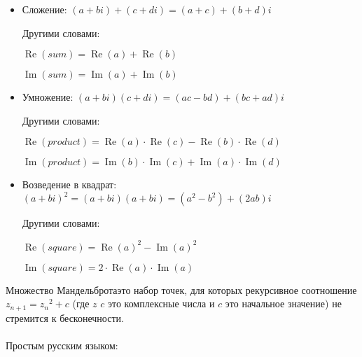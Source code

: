\begin{itemize}
\item Сложение: $(a+bi) + (c+di) = (a+c) + (b+d)i$

Другими словами:

$\operatorname{Re}(sum) = \operatorname{Re}(a) + \operatorname{Re}(b)$

$\operatorname{Im}(sum) = \operatorname{Im}(a) + \operatorname{Im}(b)$

\item Умножение: $(a+bi) (c+di) = (ac-bd) + (bc+ad)i$

Другими словами:

$\operatorname{Re}(product) = \operatorname{Re}(a) \cdot \operatorname{Re}(c) - \operatorname{Re}(b) \cdot \operatorname{Re}(d)$

$\operatorname{Im}(product) = \operatorname{Im}(b) \cdot \operatorname{Im}(c) + \operatorname{Im}(a) \cdot \operatorname{Im}(d)$

\item Возведение в квадрат: $(a+bi)^2 = (a+bi) (a+bi) = (a^2-b^2) + (2ab)i$

Другими словами:

$\operatorname{Re}(square) = \operatorname{Re}(a)^2-\operatorname{Im}(a)^2$

$\operatorname{Im}(square) = 2 \cdot \operatorname{Re}(a) \cdot \operatorname{Im}(a)$

\end{itemize}


Множество Мандельброта\EMDASH{}это набор точек, для которых рекурсивное соотношение
 $z_{n+1} = {z_n}^2 + c$ 
(где $z$ \AndENRU $c$ это комплексные числа и $c$ 
это начальное значение)
не стремится к бесконечности.\\
\\
Простым русским языком: 

